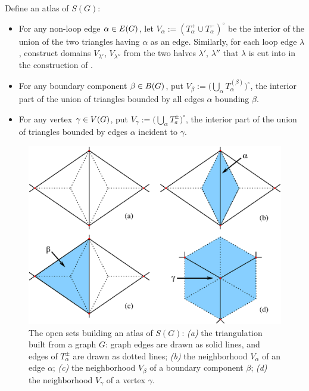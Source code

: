 Define an atlas of $S(G)$:
\begin{itemize}
\item For any non-loop edge $\alpha \in E(G)$, let $V_\alpha :=
  (T_\alpha^+ \cup T_\alpha^-)^\circ$ be the interior of the union of
  the two triangles having $\alpha$ as an edge.  Similarly, for each loop edge
  $\lambda$, construct domains $V_{\lambda'}$, $V_{\lambda''}$ from
  the two halves $\lambda'$, $\lambda''$ that $\lambda$ is cut into
  in the construction of .
\item For any boundary component $\beta \in B(G)$, put $V_\beta := \bigl(
  \bigcup_{\alpha} T_\alpha^{(\beta)} \bigr)^\circ$, the interior part of the union of triangles
  bounded by all edges $\alpha$ bounding $\beta$.
\item For any vertex $\gamma \in V(G)$, put $V_\gamma := \bigl( \bigcup_\alpha T_a^\pm
  \bigr)^\circ$, the interior part of the union of triangles bounded by
  edges $\alpha$ incident to $\gamma$.
\end{itemize}
\begin{figure}[btp]
  \centering\includegraphics[width=\textwidth]{atlas}
  \caption{The open sets building an atlas of $S(G)$: \textsl{(a)} the
    triangulation built from a graph $G$: graph edges are drawn as
    solid lines, and edges of $T_\alpha^{\pm}$ are drawn as dotted
    lines; \textsl{(b)} the neighborhood $V_\alpha$ of an edge
    $\alpha$; \textsl{(c)} the neighborhood $V_\beta$ of a boundary
    component $\beta$; \textsl{(d)} the neighborhood $V_\gamma$ of a
    vertex $\gamma$.}
  \label{fig:atlas}
\end{figure}

